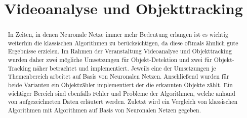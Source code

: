 \documentclass[conference]{IEEEtran}
\begin{document}
	
	\title{Videoanalyse und Objekttracking}
	
	\author{
		\and
		\and
	}
	
	
	\maketitle
	
	\begin{abstract}
		In Zeiten, in denen Neuronale Netze immer mehr Bedeutung erlangen ist es wichtig weiterhin die klassischen Algorithmen zu berücksichtigen, da diese oftmals ähnlich gute Ergebnisse erzielen. Im Rahmen der Veranstaltung Videoanalyse und Objekttracking wurden daher zwei mögliche Umsetzungen für Objekt-Detektion und zwei für Objekt-Tracking näher betrachtet und implementiert. Jeweils eine der Umsetzungen je Themenbereich arbeitet auf Basis von Neuronalen Netzen. Anschließend wurden für beide Varianten ein Objektzähler implementiert der die erkannten Objekte zählt. Ein wichtiger Bereich sind ebenfalls Fehler und Probleme der Algorithmen, welche anhand von aufgezeichneten Daten erläutert werden. Zuletzt wird ein Vergleich von klassischen Algorithmen mit Algorithmen auf Basis von Neuronalen Netzen gegeben.
	\end{abstract}
	
	
\end{document}
